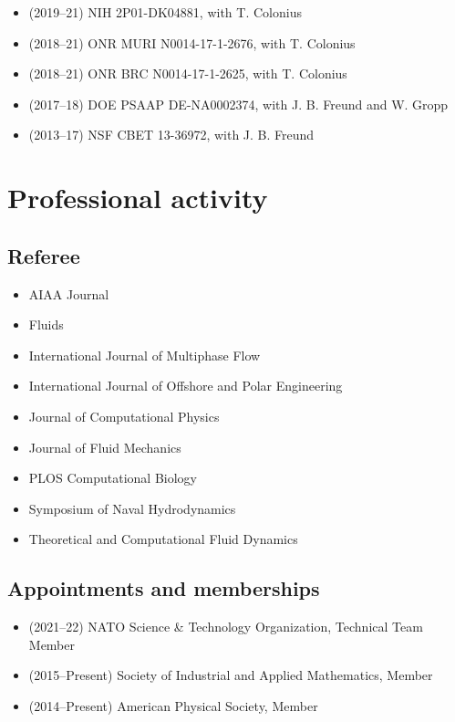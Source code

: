 \begin{itemize}
    \item (2019--21) NIH 2P01-DK04881, with T. Colonius
    \item (2018--21) ONR MURI N0014-17-1-2676, with T. Colonius
    \item (2018--21) ONR BRC N0014-17-1-2625, with T. Colonius
    \item (2017--18) DOE PSAAP DE-NA0002374, with J. B. Freund and W. Gropp
    \item (2013--17) NSF CBET 13-36972, with J. B. Freund
\end{itemize}

\section{Professional activity}

\subsection{Referee}

\begin{itemize}
    \item AIAA Journal
    \item Fluids
    \item International Journal of Multiphase Flow
    \item International Journal of Offshore and Polar Engineering
    \item Journal of Computational Physics
    \item Journal of Fluid Mechanics
    \item PLOS Computational Biology
    \item Symposium of Naval Hydrodynamics
    \item Theoretical and Computational Fluid Dynamics
\end{itemize}

\subsection{Appointments and memberships}

\begin{itemize}
    \item (2021--22) NATO Science \& Technology Organization, Technical Team Member
    \item (2015--Present) Society of Industrial and Applied Mathematics, Member
    \item (2014--Present) American Physical Society, Member
\end{itemize}

